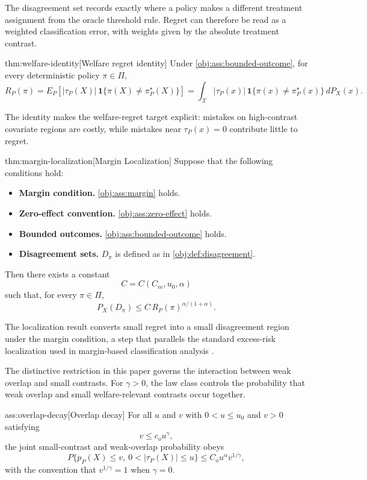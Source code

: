 \documentclass[11pt]{article}
\begin{document}
The disagreement set records exactly where a policy makes a different treatment assignment from the oracle threshold rule.  Regret can therefore be read as a weighted classification error, with weights given by the absolute treatment contrast.

\begin{theoremv}{thm:welfare-identity}[Welfare regret identity]
Under \cref{obj:ass:bounded-outcome}, for every deterministic policy \(\pi\in\Pi\),
\[
R_P(\pi)
=
E_P\!\left[
|\tau_P(X)|\,\mathbf 1\{\pi(X)\ne\pi^\star_P(X)\}
\right]
=
\int_{\mathcal X}
|\tau_P(x)|\,\mathbf 1\{\pi(x)\ne\pi^\star_P(x)\}\,dP_X(x).
\]
\end{theoremv}

The identity makes the welfare-regret target explicit: mistakes on high-contrast covariate regions are costly, while mistakes near \(\tau_P(x)=0\) contribute little to regret.

\begin{theoremv}{thm:margin-localization}[Margin Localization]
Suppose that the following conditions hold:
\begin{itemize}
\item \textbf{Margin condition.} \cref{obj:ass:margin} holds.
\item \textbf{Zero-effect convention.} \cref{obj:ass:zero-effect} holds.
\item \textbf{Bounded outcomes.} \cref{obj:ass:bounded-outcome} holds.
\item \textbf{Disagreement sets.} \(D_\pi\) is defined as in \cref{obj:def:disagreement}.
\end{itemize}
Then there exists a constant
\[
C=C(C_m,u_0,\alpha)
\]
such that, for every \(\pi\in\Pi\),
\[
P_X(D_\pi)
\le
C\,R_P(\pi)^{\alpha/(1+\alpha)} .
\]
\end{theoremv}

The localization result converts small regret into a small disagreement region under the margin condition, a step that parallels the standard excess-risk localization used in margin-based classification analysis \citep{Audibert2007,Massart2006,Tsybakov2009}.

The distinctive restriction in this paper governs the interaction between weak overlap and small contrasts.  For \(\gamma>0\), the law class controls the probability that weak overlap and small welfare-relevant contrasts occur together.

\begin{assumptionv}{ass:overlap-decay}[Overlap decay]
For all \(u\) and \(v\) with \(0<u\le u_0\) and \(v>0\) satisfying
\[
v\le c_o u^\gamma,
\]
the joint small-contrast and weak-overlap probability obeys
\[
P\{p_P(X)\le v,\ 0<|\tau_P(X)|\le u\}
   \le C_o u^\alpha v^{1/\gamma},
\]
with the convention that \(v^{1/\gamma}=1\) when \(\gamma=0\).
\end{assumptionv}
\end{document}
